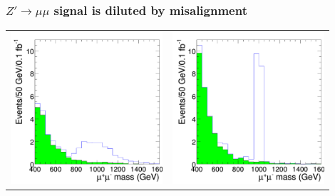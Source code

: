 \documentclass[compress]{beamer}
\begin{document}
\begin{frame}
\frametitle{$Z'\to\mu\mu$ signal is diluted by misalignment}

\begin{tabular}{p{0.45\linewidth} p{0.45\linewidth}}
  \begin{minipage}{\linewidth}
    \includegraphics[width=\linewidth]{plots/zmumu/Figure_003-019-b.pdf}
  \end{minipage} &
  \begin{minipage}{\linewidth}
    \includegraphics[width=\linewidth]{plots/zmumu/Figure_003-019-a.pdf}

\end{minipage}
\end{tabular}
\end{frame}
\end{document}
